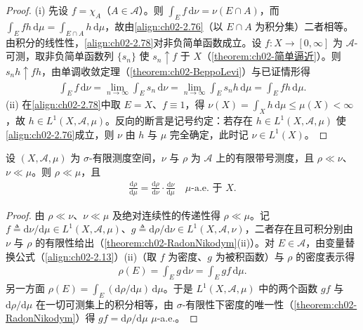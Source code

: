 \documentclass[../../main.tex]{subfiles}%
\begin{document}
\begin{proof}
(i) 先设 $f=\chi_A$（$A\in\mathscr A$）。则 $\int_Ef\,\mathrm{d}\nu=\nu(E\cap A)$，而 $\int_Efh\,\mathrm{d}\mu=\int_{E\cap A}h\,\mathrm{d}\mu$，故由\eqref{align:ch02-2.76}（以 $E\cap A$ 为积分集）二者相等。由积分的线性性，\eqref{align:ch02-2.78}对非负简单函数成立。设 $f:X\to[0,\infty]$ 为 $\mathscr A$-可测，取非负简单函数列 $\{s_n\}$ 使 $s_n\uparrow f$ 于 $X$（\cref{theorem:ch02-简单逼近}）。则 $s_nh\uparrow fh$，由单调收敛定理（\cref{theorem:ch02-BeppoLevi}）与已证情形得
\begin{align*}
\int_Ef\,\mathrm{d}\nu=\lim_{n\to\infty}\int_Es_n\,\mathrm{d}\nu=\lim_{n\to\infty}\int_Es_nh\,\mathrm{d}\mu=\int_Efh\,\mathrm{d}\mu.
\end{align*}
(ii) 在\eqref{align:ch02-2.78}中取 $E=X$、$f\equiv1$，得 $\nu(X)=\int_Xh\,\mathrm{d}\mu\leqslant\mu(X)<\infty$，故 $h\in L^1(X,\mathscr A,\mu)$。反向的断言是记号约定：若存在 $h\in L^1(X,\mathscr A,\mu)$ 使\eqref{align:ch02-2.76}成立，则 $\nu$ 由 $h$ 与 $\mu$ 完全确定，此时记 $\nu\in L^1(X)$。
\end{proof}

\begin{remark}\label{remark:ch02-RN链式}
设 $(X,\mathscr A,\mu)$ 为 $\sigma$-有限测度空间，$\nu$ 与 $\rho$ 为 $\mathscr A$ 上的有限带号测度，且 $\rho\ll\nu$、$\nu\ll\mu$。则 $\rho\ll\mu$，且
\begin{align*}
\frac{\mathrm{d}\rho}{\mathrm{d}\mu}=\frac{\mathrm{d}\rho}{\mathrm{d}\nu}\cdot\frac{\mathrm{d}\nu}{\mathrm{d}\mu}\quad\mu\text{-a.e. 于 }X.
\end{align*}
\end{remark}

\begin{proof}
由 $\rho\ll\nu$、$\nu\ll\mu$ 及绝对连续性的传递性得 $\rho\ll\mu$。记 $f\triangleq\mathrm{d}\nu/\mathrm{d}\mu\in L^1(X,\mathscr A,\mu)$、$g\triangleq\mathrm{d}\rho/\mathrm{d}\nu\in L^1(X,\mathscr A,\nu)$，二者存在且可积分别由 $\nu$ 与 $\rho$ 的有限性给出（\cref{theorem:ch02-RadonNikodym}(ii)）。对 $E\in\mathscr A$，由变量替换公式（\eqref{align:ch02-2.13}）(ii)（取 $f$ 为密度、$g$ 为被积函数）与 $\rho$ 的密度表示得
\begin{align*}
\rho(E)=\int_Eg\,\mathrm{d}\nu=\int_Egf\,\mathrm{d}\mu.
\end{align*}
另一方面 $\rho(E)=\int_E(\mathrm{d}\rho/\mathrm{d}\mu)\,\mathrm{d}\mu$。于是 $L^1(X,\mathscr A,\mu)$ 中的两个函数 $gf$ 与 $\mathrm{d}\rho/\mathrm{d}\mu$ 在一切可测集上的积分相等，由 $\sigma$-有限性下密度的唯一性（\cref{theorem:ch02-RadonNikodym}）得 $gf=\mathrm{d}\rho/\mathrm{d}\mu$ $\mu$-a.e.。
\end{proof}
\end{document}
